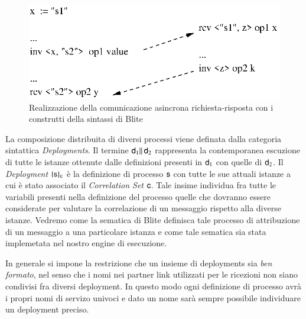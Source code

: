 \begin{figure}[ht]
\begin{center}
  \includegraphics{linguaggio/dia/com}
   \caption[Comunicazione asincrona con Blite]{
   	\textsf{{\small Realizzazione della comunicazione asincrona
   	richiesta-risposta con i construtti della sintassi di Blite}} }
  \label{fig:lin:com}
\end{center}
\end{figure}

La composizione distribuita di diversi processi viene definata dalla categoria
sintattica \emph{Deployments}. Il termine ${\sf d}_1 \|\, {\sf d}_2$ rappresenta la
contemporanea escuzione di tutte le istanze ottenute dalle
definizioni presenti in ${\sf d}_1$ con quelle di ${\sf d}_2$. Il \emph{Deployment}
$\{ {\sf s} \}_{{\sf c}}$ è la definizione di processo ${\sf s}$ con tutte le sue attuali
istanze a cui è stato associato il \emph{Correlation Set} ${\sf c}$. Tale insime
individua fra tutte le variabili presenti nella definizione del processo quelle
che dovranno essere considerate per valutare la correlazione di un messaggio
rispetto alla diverse istanze. Vedremo come la sematica di Blite definisca tale
processo di attribuzione di un messaggio a una particolare istanza e come tale
sematica sia stata implemetata nel nostro engine di esecuzione.
 
In generale si impone la restrizione che un insieme di deployments sia
\emph{ben formato}, nel senso che i nomi nei partner link utilizzati per le
ricezioni non siano condivisi fra diversi deployment. In questo modo ogni
definizione di processo avrà i propri nomi di servizo univoci e dato un nome
sarà sempre possibile individuare un deployment preciso.
\\

